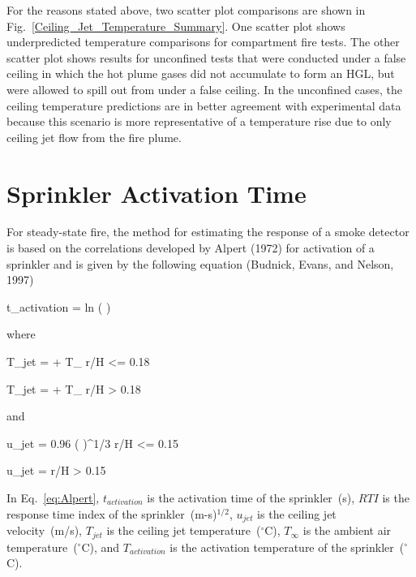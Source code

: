 For the reasons stated above, two scatter plot comparisons are shown in Fig.~\ref{Ceiling_Jet_Temperature_Summary}. One scatter plot shows underpredicted temperature comparisons for compartment fire tests. The other scatter plot shows results for unconfined tests that were conducted under a false ceiling in which the hot plume gases did not accumulate to form an HGL, but were allowed to spill out from under a false ceiling. In the unconfined cases, the ceiling temperature predictions are in better agreement with experimental data because this scenario is more representative of a temperature rise due to only ceiling jet flow from the fire plume.

\clearpage


\section{Sprinkler Activation Time}

For steady-state fire, the method for estimating the response of a smoke detector is based on the correlations developed by Alpert (1972) for activation of a sprinkler and is given by the following equation (Budnick, Evans, and Nelson, 1997)

\be
t_{activation} =   ln \left(  \right)\label{eq:Alpert}
\ee

\noindent where

\be
T_{jet} =  + T_\infty {} r/H <= 0.18
\label{eq:Alpert_Tjet_lt}
\ee

\be
T_{jet} =  + T_\infty {} r/H > 0.18
\label{eq:Alpert_Tjet_gt}
\ee

\noindent and

\be
u_{jet} = 0.96 \left(  \right)^{1/3}  r/H <= 0.15
\label{eq:Alpert_ujet_lt}
\ee

\be
u_{jet} =   r/H > 0.15
\label{eq:Alpert_ujet_gt}
\ee

In Eq.~\ref{eq:Alpert}, $t_{activation}$ is the activation time of the sprinkler~(s), $RTI$ is the response time index of the sprinkler~(m-s)$^{1/2}$, $u_{jet}$ is the ceiling jet velocity~(m/s), $T_{jet}$ is the ceiling jet temperature~($^\circ$C), $T_\infty$ is the ambient air temperature~($^\circ$C), and $T_{activation}$ is the activation temperature of the sprinkler~($^\circ$C).

